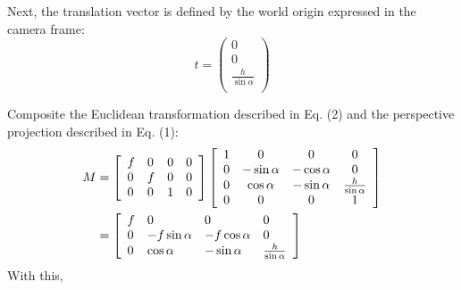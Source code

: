 \begin{questions}
\begin{parts}
\begin{subparts}
\begin{solution}
        Next, the translation vector is defined by the world origin expressed in the camera frame:
        \[ t = \left( \begin{array} {c} {0} \\ {0} \\ {\frac{h}{\sin \alpha}} \\ \end{array} \right) \]
        
        Composite the Euclidean transformation described in Eq. (2) and the perspective projection described in Eq. (1):
        \[ 
        \begin{split}
            M 
            &= \left[ \begin{array} { l l l l } { f } & { 0 } & { 0 } & { 0 } \\ { 0 } & { f } & { 0 } & { 0 } \\ { 0 } & { 0 } & { 1 } & { 0 } \end{array} \right] \left[ \begin{array} { c c c c } { 1 } & { 0 } & { 0 } & { 0 } \\ { 0 } & { - \sin \alpha } & { - \cos \alpha } & { 0 } \\ { 0 } & { \cos \alpha } & { - \sin \alpha } & { \frac{h}{\sin \alpha} } \\ { 0 } & { 0 } & { 0 } & { 1 } \end{array} \right] \\
            &= \left[ \begin{array} { l l l l } { f } & { 0 } & { 0 } & { 0 } \\ { 0 } & { -f\sin\alpha } & { -f\cos\alpha } & { 0 } \\ { 0 } & { \cos \alpha } & { -\sin \alpha } & { \frac{h}{\sin \alpha} } \end{array} \right] \\
        \end{split}
        \]
    With this, 
    \end{solution}
    

\end{subparts}
\end{parts}
\end{questions}

